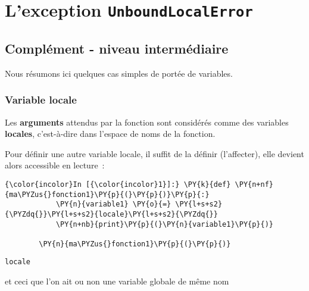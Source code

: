     
    
    
    

    

    \hypertarget{lexception-unboundlocalerror}{%
\section{\texorpdfstring{L'exception
\texttt{UnboundLocalError}}{L'exception UnboundLocalError}}\label{lexception-unboundlocalerror}}

    \hypertarget{compluxe9ment---niveau-intermuxe9diaire}{%
\subsection{Complément - niveau
intermédiaire}\label{compluxe9ment---niveau-intermuxe9diaire}}

    Nous résumons ici quelques cas simples de portée de variables.

    \hypertarget{variable-locale}{%
\subsubsection{Variable locale}\label{variable-locale}}

    Les \textbf{arguments} attendus par la fonction sont considérés comme
des variables \textbf{locales}, c'est-à-dire dans l'espace de noms de la
fonction.

Pour définir une autre variable locale, il suffit de la définir
(l'affecter), elle devient alors accessible en lecture~:

    \begin{Verbatim}[commandchars=\\\{\}]
{\color{incolor}In [{\color{incolor}1}]:} \PY{k}{def} \PY{n+nf}{ma\PYZus{}fonction1}\PY{p}{(}\PY{p}{)}\PY{p}{:}
            \PY{n}{variable1} \PY{o}{=} \PY{l+s+s2}{\PYZdq{}}\PY{l+s+s2}{locale}\PY{l+s+s2}{\PYZdq{}}
            \PY{n+nb}{print}\PY{p}{(}\PY{n}{variable1}\PY{p}{)}
        
        \PY{n}{ma\PYZus{}fonction1}\PY{p}{(}\PY{p}{)}
\end{Verbatim}


    \begin{Verbatim}[commandchars=\\\{\}]
locale

    \end{Verbatim}

    et ceci que l'on ait ou non une variable globale de même nom


